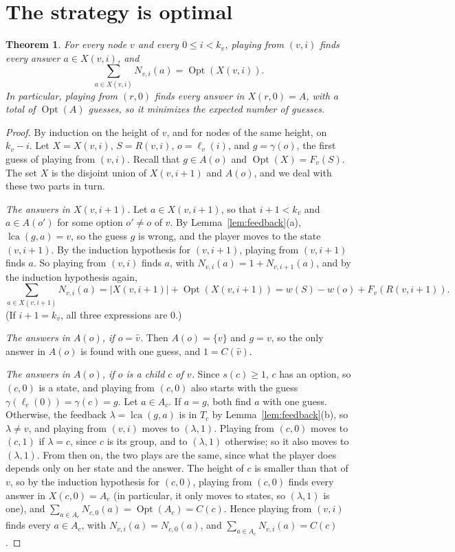 \documentclass[11pt]{article}
\newtheorem{theorem}{Theorem}
\newcommand{\lca}{\operatorname{lca}}
\newcommand{\Opt}{\operatorname{Opt}}
\begin{document}
\section{The strategy is optimal}
\label{sec:main}

\begin{theorem}
  \label{thm:main}
  For every node $v$ and every $0 \le i < k_v$, playing from $(v, i)$ finds every
  answer $a \in X(v, i)$, and
  \[
    \sum_{a \in X(v, i)} N_{v,i}(a) = \Opt(X(v, i)).
  \]
  In particular, playing from $(r, 0)$ finds every answer in $X(r, 0) = A$, with
  a total of $\Opt(A)$ guesses, so it minimizes the expected number of guesses.
\end{theorem}

\begin{proof}
  By induction on the height of $v$, and for nodes of the same height, on
  $k_v - i$. Let $X = X(v, i)$, $S = R(v, i)$, $o = \ell_v(i)$, and
  $g = \gamma(o)$, the first guess of playing from $(v, i)$. Recall that
  $g \in A(o)$ and $\Opt(X) = F_v(S)$. The set $X$ is the disjoint union of
  $X(v, i + 1)$ and $A(o)$, and we deal with these two parts in turn.

  \emph{The answers in $X(v, i + 1)$.} Let $a \in X(v, i + 1)$, so that
  $i + 1 < k_v$ and $a \in A(o')$ for some option $o' \ne o$ of $v$. By
  Lemma~\ref{lem:feedback}(a), $\lca(g, a) = v$, so the guess $g$ is wrong, and
  the player moves to the state $(v, i + 1)$. By the induction hypothesis for
  $(v, i + 1)$, playing from $(v, i + 1)$ finds $a$. So playing from $(v, i)$
  finds $a$, with $N_{v,i}(a) = 1 + N_{v,i+1}(a)$, and by the induction
  hypothesis again,
  \[
    \sum_{a \in X(v, i + 1)} N_{v,i}(a)
    = |X(v, i + 1)| + \Opt(X(v, i + 1))
    = w(S) - w(o) + F_v(R(v, i + 1)).
  \]
  (If $i + 1 = k_v$, all three expressions are $0$.)

  \emph{The answers in $A(o)$, if $o = \hat v$.} Then $A(o) = \{v\}$ and $g = v$,
  so the only answer in $A(o)$ is found with one guess, and $1 = C(\hat v)$.

  \emph{The answers in $A(o)$, if $o$ is a child $c$ of $v$.} Since
  $s(c) \ge 1$, $c$ has an option, so $(c, 0)$ is a state, and playing from
  $(c, 0)$ also starts with the guess $\gamma(\ell_c(0)) = \gamma(c) = g$. Let
  $a \in A_c$. If $a = g$, both find $a$ with one guess. Otherwise, the feedback
  $\lambda = \lca(g, a)$ is in $T_c$ by Lemma~\ref{lem:feedback}(b), so
  $\lambda \ne v$, and playing from $(v, i)$ moves to $(\lambda, 1)$. Playing
  from $(c, 0)$ moves to $(c, 1)$ if $\lambda = c$, since $c$ is its group, and to
  $(\lambda, 1)$ otherwise; so it also moves to $(\lambda, 1)$. From then on, the
  two plays are the same, since what the player does depends only on her state
  and the answer. The height of $c$ is smaller than that of $v$, so by the
  induction hypothesis for $(c, 0)$, playing from $(c, 0)$ finds every answer in
  $X(c, 0) = A_c$ (in particular, it only moves to states, so $(\lambda, 1)$ is
  one), and $\sum_{a \in A_c} N_{c,0}(a) = \Opt(A_c) = C(c)$. Hence playing from
  $(v, i)$ finds every $a \in A_c$, with $N_{v,i}(a) = N_{c,0}(a)$, and
  $\sum_{a \in A_c} N_{v,i}(a) = C(c)$.


\end{proof}
\end{document}
